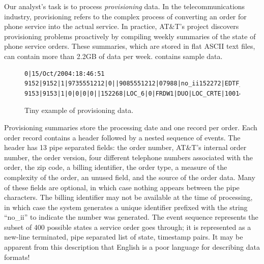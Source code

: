 Our analyst's task is to process \textit{provisioning} data.  In the
telecommunications industry, {provisioning} refers to
the complex process of converting an order for phone
service into the actual service.  In practice, AT\&T's \dibbler{}
project discovers provisioning problems proactively by compiling
weekly summaries of the state of phone service
orders.  These summaries, which are stored in flat ASCII text files,
can contain more than 2.2GB of data per
week.  contains sample \dibbler{} data.
\begin{figure}
\begin{small}
\begin{center}
\begin{verbatim}
0|15/Oct/2004:18:46:51
9152|9152|1|9735551212|0||9085551212|07988|no_ii152272|EDTF_6|0|APRL1|DUO|10|16/Oct/2004:10:02:10
9153|9153|1|0|0|0|0||152268|LOC_6|0|FRDW1|DUO|LOC_CRTE|1001476800|LOC_OS_10|17/Oct/2004:08:14:21
\end{verbatim}
\caption{\label{figure:dibbler-records}Tiny example of \dibbler{} provisioning data.\vspace{-1cm}}
\end{center}
\end{small}
\end{figure}

Provisioning summaries store the processing date and one record per
order.  Each order record contains a header followed by a nested
sequence of events.  The header has 13 pipe separated fields: the
order number, AT\&T's internal order number, the order version, four
different telephone numbers associated with the order, the zip code, a
billing identifier, the order type, a measure of the complexity of the
order, an unused field, and the source of the order data.  Many of
these fields are optional, in which case nothing appears between the
pipe characters.  The billing identifier may not be available at the
time of processing, in which case the system generates a unique
identifier prefixed with the string ``no\_ii'' to indicate the number
was generated. The event sequence represents the subset of 400
possible states a service order goes through; it is represented as a
new-line terminated, pipe separated list of state, timestamp pairs.
It may be apparent from this description that English is a poor
language for describing data formats!  


